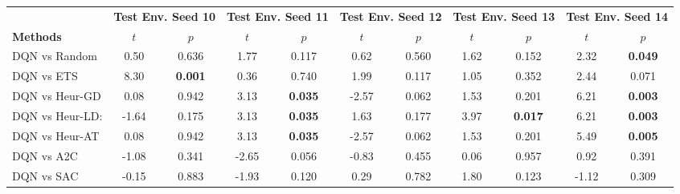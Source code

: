 
\begin{tabular}{lcccccccccc}
	\toprule 
	& \multicolumn{2}{c}{\textbf{Test Env. Seed 10}} & \multicolumn{2}{c}{\textbf{Test Env. Seed 11}} & \multicolumn{2}{c}{\textbf{Test Env. Seed 12}} & \multicolumn{2}{c}{\textbf{Test Env. Seed 13}} & \multicolumn{2}{c}{\textbf{Test Env. Seed 14}} \\
	\cmidrule(lr){2-3} \cmidrule(lr){4-5} \cmidrule(lr){6-7} \cmidrule(lr){8-9} \cmidrule(lr){10-11}
	\textbf{Methods} &$t$               &$p$                          &$t$               &$p$                          &$t$               &$p$                          &$t$               &$p$                          &$t$               &$p$                          \\
	\midrule 
	DQN vs Random    & 0.50           & 0.636                  & 1.77           & 0.117                  & 0.62           & 0.560                  & 1.62           & 0.152                  & 2.32           & \textbf{0.049}         \\
	DQN vs ETS       & 8.30           & \textbf{0.001}         & 0.36           & 0.740                  & 1.99           & 0.117                  & 1.05           & 0.352                  & 2.44           & 0.071                  \\
	DQN vs Heur-GD   & 0.08           & 0.942                  & 3.13           & \textbf{0.035}         & -2.57          & 0.062                  & 1.53           & 0.201                  & 6.21           & \textbf{0.003}         \\
	DQN vs Heur-LD:  & -1.64          & 0.175                  & 3.13           & \textbf{0.035}         & 1.63           & 0.177                  & 3.97           & \textbf{0.017}         & 6.21           & \textbf{0.003}         \\
	DQN vs Heur-AT   & 0.08           & 0.942                  & 3.13           & \textbf{0.035}         & -2.57          & 0.062                  & 1.53           & 0.201                  & 5.49           & \textbf{0.005}         \\
	DQN vs A2C       & -1.08          & 0.341                  & -2.65          & 0.056                  & -0.83          & 0.455                  & 0.06           & 0.957                  & 0.92           & 0.391                  \\
	DQN vs SAC       & -0.15          & 0.883                  & -1.93          & 0.120                  & 0.29           & 0.782                  & 1.80           & 0.123                  & -1.12          & 0.309                  \\

\end{tabular}
